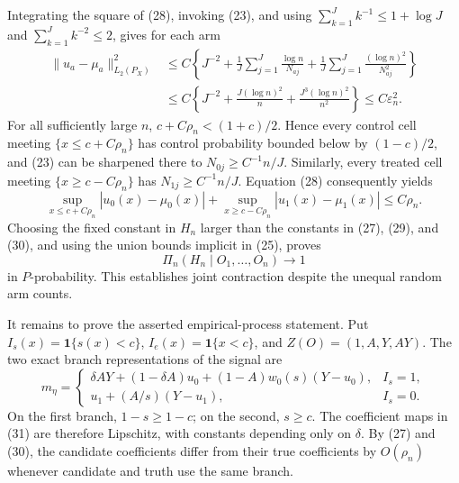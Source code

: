 Integrating the square of (28), invoking (23), and using
\(\sum_{k=1}^Jk^{-1}\le1+\log J\) and \(\sum_{k=1}^Jk^{-2}\le2\), gives for each arm
\begin{equation}
\begin{aligned}
 \|u_a-\mu_a\|_{L_2(P_X)}^2
 &\le C\left\{J^{-2}+\frac1J\sum_{j=1}^J\frac{\log n}{N_{aj}}
                   +\frac1J\sum_{j=1}^J\frac{(\log n)^2}{N_{aj}^2}\right\}\\
 &\le C\left\{J^{-2}+\frac{J(\log n)^2}{n}
                   +\frac{J^3(\log n)^2}{n^2}\right\}
 \le C\varepsilon_n^2.
\end{aligned}                                                                             \tag{29}
\end{equation}
For all sufficiently large \(n\), \(c+C\rho_n<(1+c)/2\).  Hence every control cell meeting \(\{x\le c+C\rho_n\}\) has control probability bounded below by \((1-c)/2\), and (23) can be sharpened there to \(N_{0j}\ge C^{-1}n/J\).  Similarly, every treated cell meeting \(\{x\ge c-C\rho_n\}\) has \(N_{1j}\ge C^{-1}n/J\).  Equation (28) consequently yields
\begin{equation}
 \sup_{x\le c+C\rho_n}|u_0(x)-\mu_0(x)|
 +\sup_{x\ge c-C\rho_n}|u_1(x)-\mu_1(x)|\le C\rho_n.                                  \tag{30}
\end{equation}
Choosing the fixed constant in \(H_n\) larger than the constants in (27), (29), and (30), and using the union bounds implicit in (25), proves
\begin{equation}
 \Pi_n(H_n\mid O_1,\ldots,O_n)\longrightarrow1
\end{equation}
in \(P\)-probability.  This establishes joint contraction despite the unequal random arm counts.

It remains to prove the asserted empirical-process statement.  Put
\(I_s(x)=\mathbf1\{s(x)<c\}\), \(I_e(x)=\mathbf1\{x<c\}\), and
\(Z(O)=(1,A,Y,AY)\).  The two exact branch representations of the signal are
\begin{equation}
 m_\eta=
 \begin{cases}
 \delta AY+(1-\delta A)u_0+(1-A)w_0(s)(Y-u_0),&I_s=1,\\
 u_1+(A/s)(Y-u_1),&I_s=0.
 \end{cases}                                                                             \tag{31}
\end{equation}
On the first branch, \(1-s\ge1-c\); on the second, \(s\ge c\).  The coefficient maps in (31) are therefore Lipschitz, with constants depending only on \(\delta\).  By (27) and (30), the candidate coefficients differ from their true coefficients by \(O(\rho_n)\) whenever candidate and truth use the same branch.

